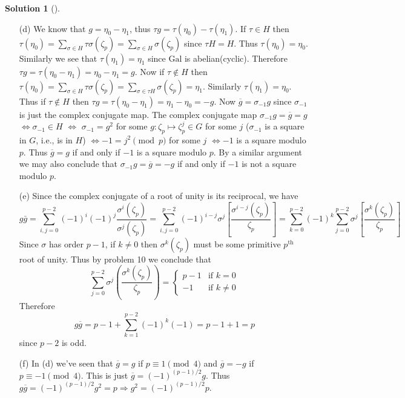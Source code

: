 \documentclass{article}
\theoremstyle{definition}
\newtheorem*{sol}{Solution}
\newenvironment{sols}[1][]{%
  \begin{sol}[#1]$ $\par\nobreak\ignorespaces
}{%
  \end{sol}
}
\newcommand{\Ra}{\Rightarrow}
\newcommand{\Lra}{\Leftrightarrow}
\newcommand{\Gal}{\text{Gal}}
\begin{document}
\begin{sols}
\begin{enumerate}
		\item[(d)] We know that $g = \eta_0 - \eta_1$, thus $\tau g = \tau(\eta_0) - \tau(\eta_1)$.
			If $\tau \in H$ then $\tau(\eta_0) = \sum_{\sigma \in H} \tau \sigma(\zeta_p) = \sum_{\sigma \in H} \sigma(\zeta_p)$ since $\tau H = H$.
			Thus $\tau(\eta_0) = \eta_0$.
			Similarly we see that $\tau(\eta_1) = \eta_1$ since $\Gal$ is abelian(cyclic).
			Therefore $\tau g = \tau(\eta_0 - \eta_1) = \eta_0 - \eta_1 = g$.
			Now if $\tau \notin H$ then $\tau(\eta_0) = \sum_{\sigma \in H} \tau \sigma(\zeta_p) = \sum_{\sigma \in \tau H} \sigma(\zeta_p) = \eta_1$.
			Similarly $\tau(\eta_1) = \eta_0$.
			Thus if $\tau \notin H$ then $\tau g = \tau(\eta_0 - \eta_1) = \eta_1 - \eta_0 = -g$.
			Now $\overline{g} = \sigma_{-1} g$ since $\sigma_{-1}$ is just the complex conjugate map.
			The complex conjugate map $\sigma_{-1} g = \overline{g} = g$
			$\Lra \sigma_{-1} \in H$
			$\Lra$ $\sigma_{-1} = g^2$ for some $g:\zeta_p \mapsto \zeta_p^j \in G$ for some $j$ ($\sigma_{-1}$ is a square in $G$, i.e., is in $H$) 
			$\Lra -1 = j^2 \pmod{p}$ for some $j$ $\Lra -1$ is a square modulo $p$.
			Thus $\overline{g} = g$ if and only if $-1$ is a square modulo $p$.
			By a similar argument we may also conclude that $\sigma_{-1} g = \overline{g} = -g$ if and only if $-1$ is not a square modulo $p$.
			
		\item[(e)] Since the complex conjugate of a root of unity is its reciprocal, we have
			\[
					g \bar{g} = \sum_{i, j = 0}^{p - 2} (-1)^i (-1)^j \frac{\sigma^i (\zeta_p)}{\sigma^j (\zeta_p)} = \sum_{i, j = 0}^{p - 2} (-1)^{i - j} \sigma^j \left[ \frac{\sigma^{i - j}(\zeta_p)}{\zeta_p} \right] = \sum_{k = 0}^{p - 2} (-1)^k \sum_{j = 0}^{p - 2} \sigma^j \left[ \frac{\sigma^k(\zeta_p)}{\zeta_p} \right]
			\]
			Since $\sigma$ has order $p - 1$, if $k \neq 0$ then $\sigma^k(\zeta_p)$ must be some primitive $p^{\text{th}}$ root of unity.
			Thus by problem 10 we conclude that
			\[
				\sum_{j = 0}^{p - 2} \sigma^j \left( \frac{\sigma^k(\zeta_p)}{\zeta_p} \right) = 
				\begin{cases}
					p - 1 & \text{if } k = 0\\
					-1 & \text{if } k \neq 0
				\end{cases}
			\]
			Therefore
			\[
				g \overline{g} = p - 1 + \sum_{k = 1}^{p - 2} (-1)^k (-1) = p - 1 + 1 = p
			\]
			since $p - 2$ is odd.
				
		\item[(f)] In (d) we've seen that $\overline{g} = g$ if $p \equiv 1 \pmod{4}$ and $\overline{g} = -g$ if $p \equiv -1 \pmod{4}$.
			This is just $\overline{g} = (-1)^{(p - 1)/2} g$.
			Thus $g \overline{g} = (-1)^{(p - 1)/2} g^2 = p \Ra g^2 = (-1)^{(p - 1)/2} p$.

	\end{enumerate}
\end{sols}
\end{document}

